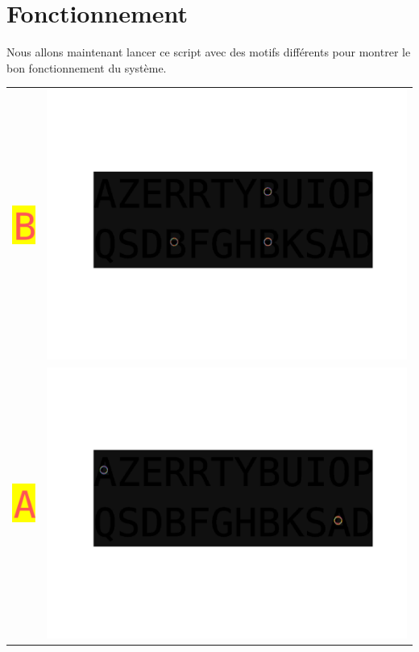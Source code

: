 \documentclass[a4paper,12pt,titlepage]{report}
\begin{document}
	\section{Fonctionnement}	
	Nous allons maintenant lancer ce script avec des motifs différents pour montrer le bon fonctionnement du système.\\
	\begin{tabular}{|c|c|}
			\includegraphics[scale=0.5]{../motif.png} & \includegraphics[scale=0.2]{illus/motiflocal0.png}\\
			\includegraphics[scale=0.5]{../motif1.png} & \includegraphics[scale=0.2]{illus/motiflocal1.png}\\

\end{tabular}
\end{document}
